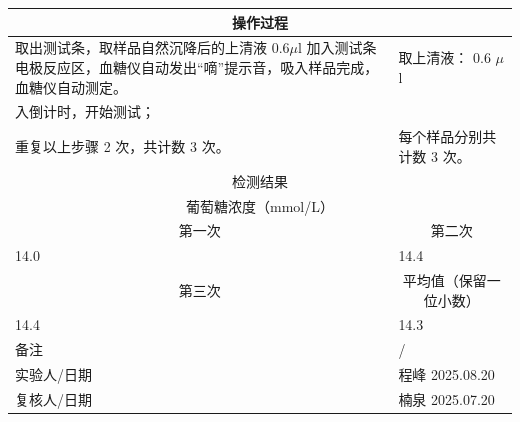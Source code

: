 \documentclass[UTF8,10pt,a4paper,fontset=fandol]{ctexart}
\newcommand{\fieldvalue}[1]{#1}
\newcommand{\handwritten}[1]{#1}
\begin{document}
\begin{tabular}{|p{8.7cm}|p{5.4cm}|}
\hline
\multicolumn{2}{|c|}{操作过程} \\ \hline
取出测试条，取样品自然沉降后的上清液 0.6$\mu$l 加入测试条电极反应区，血糖仪自动发出“嘀”提示音，吸入样品完成，血糖仪自动测定。 &
取上清液：
\fieldvalue{\handwritten{0.6}} $\mu$l \\ \hline
入倒计时，开始测试； &
 \\ \hline
重复以上步骤 2 次，共计数 3 次。 &
每个样品分别共计数
\fieldvalue{\handwritten{3}} 次。 \\ \hline
\multicolumn{2}{|c|}{检测结果} \\ \hline
\multicolumn{2}{|c|}{葡萄糖浓度（mmol/L）} \\ \hline
\multicolumn{1}{|c|}{第一次} &
\multicolumn{1}{c|}{第二次} \\ \hline
\fieldvalue{\handwritten{14.0}} &
\fieldvalue{\handwritten{14.4}} \\ \hline
\multicolumn{1}{|c|}{第三次} &
\multicolumn{1}{c|}{平均值（保留一位小数）} \\ \hline
\fieldvalue{\handwritten{14.4}} &
\fieldvalue{\handwritten{14.3}} \\ \hline
备注 &
\fieldvalue{\handwritten{/}} \\ \hline
实验人/日期 &
\fieldvalue{\handwritten{程峰}}\quad
\fieldvalue{\handwritten{2025.08.20}} \\ \hline
复核人/日期 &
\fieldvalue{\handwritten{楠泉}}\quad
\fieldvalue{\handwritten{2025.07.20}} \\ \hline
\end{tabular}
\end{document}
